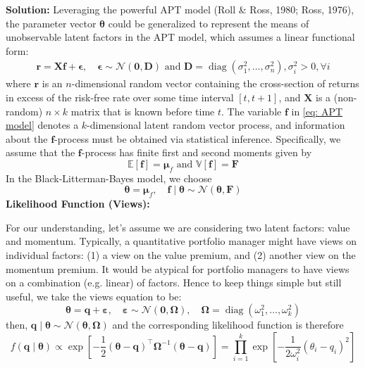 \documentclass[11pt]{article}
\theoremstyle{plain} %
\newenvironment{solution}
{\color{C2}\normalfont\begin{framed}\begingroup\textbf{Solution:} }
  {\endgroup\end{framed}}
\theoremstyle{remark}
\begin{document}
\begin{solution}
  Leveraging the powerful APT model (Roll \& Ross, 1980; Ross, 1976), the parameter vector $\boldsymbol{\theta}$ could be generalized to
  represent the means of unobservable latent factors in the APT
  model, which assumes a linear functional form:
  \begin{align}
    \boldsymbol{r}=\boldsymbol{X} \boldsymbol{f}+\boldsymbol{\epsilon},
    \quad \boldsymbol{\epsilon}\sim \mathcal{N}\left(\boldsymbol{0}, \boldsymbol{D}\right) \text{ and } \boldsymbol{D}=\operatorname{diag}\left(\sigma_1^2, \ldots, \sigma_n^2\right), \sigma_i^2>0,  \forall i
    \label{eq: APT model}
  \end{align}
  where $\boldsymbol{r}$ is an $n$-dimensional random vector containing the
  cross-section of returns in excess of the risk-free rate over some time interval
  $[t, t+1]$, and $\boldsymbol{X}$ is a (non-random) $n \times k$ matrix that is
  known before time $t$. The variable $\boldsymbol{f}$ in \cref{eq: APT model} denotes a
  $k$-dimensional latent random vector process, and
  information about the $\boldsymbol{f}$-process must be obtained via statistical
  inference. Specifically, we assume that the $\boldsymbol{f}$-process has finite
  first and second moments given by
  $$
    \mathbb{E}[\boldsymbol{f}]=\boldsymbol{\mu}_f \text { and } \mathbb{V}[\boldsymbol{f}]=\boldsymbol{F}
  $$
  In the Black-Litterman-Bayes model, we choose
  $$
    \boldsymbol{\theta} = \boldsymbol{\mu}_f,\quad
    \boldsymbol{f}\mid\boldsymbol{\theta} \sim \mathcal{N}\left(\boldsymbol{\theta}, \boldsymbol{F}\right)
  $$
  \textbf{Likelihood Function (Views):}

  For our understanding, let's assume we are considering two
  latent factors: value and momentum. Typically, a quantitative portfolio manager might have
  views on individual factors: (1) a view on the value premium, and (2) another
  view on the momentum premium. It would be atypical for portfolio managers to
  have views on a combination (e.g. linear) of factors. Hence to keep things simple but
  still useful, we take the views equation to be:
  $$
    \boldsymbol{\theta}=\boldsymbol{q}+\boldsymbol{\varepsilon}, \quad \boldsymbol{\varepsilon} \sim \mathcal{N}(\mathbf{0}, \boldsymbol{\Omega}), \quad \boldsymbol{\Omega}=\operatorname{diag}\left(\omega_1^2, \ldots, \omega_k^2\right)
  $$
  then, $\boldsymbol{q} \mid \boldsymbol{\theta} \sim \mathcal{N}(\boldsymbol{\theta},
    \boldsymbol{\Omega})$ and the corresponding likelihood function is therefore
  $$
    f(\boldsymbol{q} \mid \boldsymbol{\theta}) \propto \exp \left[-\frac{1}{2}(\boldsymbol{\theta}-\boldsymbol{q})^{\top} \boldsymbol{\Omega}^{-1}(\boldsymbol{\theta}-\boldsymbol{q})\right]=\prod_{i=1}^k \exp \left[-\frac{1}{2 \omega_i^2}\left(\theta_i-q_i\right)^2\right]
  $$


\end{solution}
\end{document}
